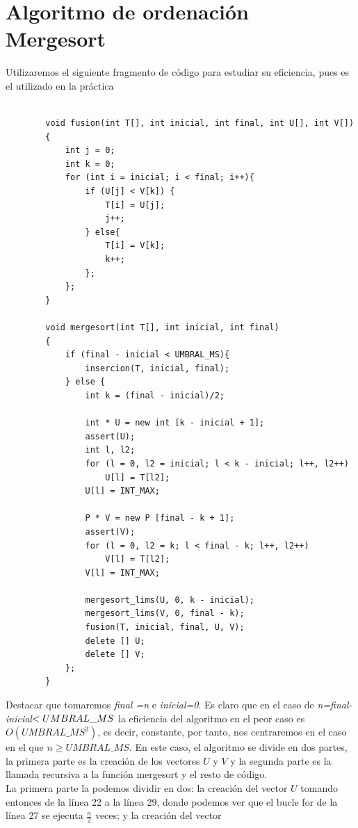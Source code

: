 \documentclass[11pt,openany]{book}
\begin{document}
\section*{Algoritmo de ordenación Mergesort}
Utilizaremos el siguiente fragmento de código para estudiar su eficiencia, pues es el utilizado en la práctica
\begin{lstlisting}
  
        void fusion(int T[], int inicial, int final, int U[], int V[])
        {
            int j = 0;
            int k = 0;
            for (int i = inicial; i < final; i++){
                if (U[j] < V[k]) {
                    T[i] = U[j];
                    j++;
                } else{
                    T[i] = V[k];
                    k++;
                };
            };
        }

        void mergesort(int T[], int inicial, int final)
        {
            if (final - inicial < UMBRAL_MS){
                insercion(T, inicial, final);
            } else {
                int k = (final - inicial)/2;

                int * U = new int [k - inicial + 1];
                assert(U);
                int l, l2;
                for (l = 0, l2 = inicial; l < k - inicial; l++, l2++)
                    U[l] = T[l2];
                U[l] = INT_MAX;

                P * V = new P [final - k + 1];
                assert(V);
                for (l = 0, l2 = k; l < final - k; l++, l2++)
                    V[l] = T[l2];
                V[l] = INT_MAX;

                mergesort_lims(U, 0, k - inicial);
                mergesort_lims(V, 0, final - k);
                fusion(T, inicial, final, U, V);
                delete [] U;
                delete [] V;
            };
        }
        \end{lstlisting}
Destacar que tomaremos \textit{final =n} e \textit{inicial=0}. Es claro que en el caso de \textit{n=final-inicial}$<\nobreak UMBRAL\_MS$
la eficiencia del algoritmo en el peor caso es $O(UMBRAL\_MS^2)$, es decir, constante, por tanto, nos centraremos en el caso en el que $n\geq UMBRAL\_MS$.
En este caso, el algoritmo se divide en dos partes, la primera parte es la creación de los vectores $U$ y $V$ y la segunda parte es la
llamada recursiva a la función mergesort y el resto de código. \\
La primera parte la podemos dividir en dos: la creación del vector $U$ tomando entonces de la línea 22 a la línea
29, donde podemos ver que el bucle for de la línea 27 se ejecuta $\frac{n}{2}$ veces; y la creación del vector
\end{document}
